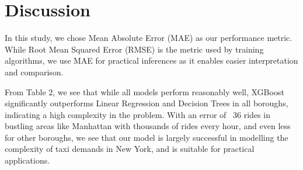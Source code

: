 \documentclass[11pt]{article}
\begin{document}
\section{Discussion}
In this study, we chose Mean Absolute Error (MAE) as our performance metric. While Root Mean Squared Error (RMSE) is the metric used by training algorithms, we use MAE for practical inferences as it enables easier interpretation and comparison.

From Table 2, we see that while all models perform reasonably well, XGBoost significantly outperforms Linear Regression and Decision Trees in all boroughs, indicating a high complexity in the problem. With an error of ~36 rides in bustling areas like Manhattan with thousands of rides every hour, and even less for other boroughs, we see that our model is largely successful in modelling the complexity of taxi demands in New York, and is suitable for practical applications.
\end{document}
